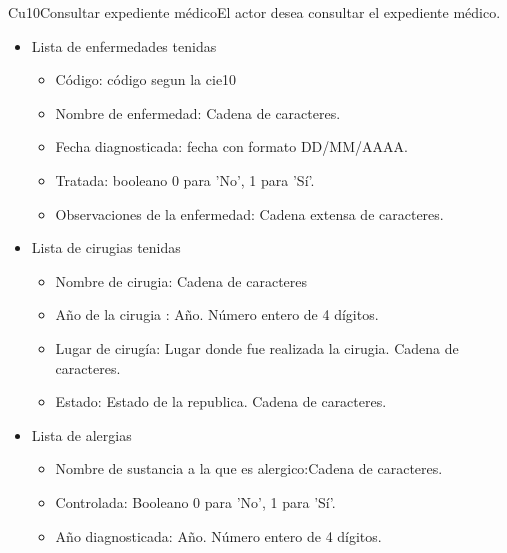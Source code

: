 \begin{UseCase}{Cu10}{Consultar expediente médico}{El actor desea consultar el expediente médico.}
{\begin{itemize}
\begin{itemize}
\begin{itemize}
                \item *Calle: Cádena de caracteres.
                \item Número: Cádena de caracteres.
                \item *Colonia: Cádena de caracteres.
                \item *Estado: Cádena de caracteres.
                \item *País : Cádena de caracteres.
                \item *Teléfono particular: Cadena de 8 a 10 caracteres.
                \item *Teléfono de emergencia: Cadena de 8 a 10 caracteres.
            \end{itemize}    
        
        \end{itemize}
        
       \item Lista de enfermedades tenidas
        \begin{itemize}
            \item Código: código segun la cie10
            \item Nombre de enfermedad: Cadena de caracteres. 
            \item Fecha diagnosticada: fecha con formato  DD/MM/AAAA.
            \item Tratada:  booleano 0 para 'No', 1 para 'Sí'.
            \item Observaciones de la enfermedad: Cadena extensa de caracteres.
        \end{itemize}
        \item Lista de cirugias tenidas
        \begin{itemize}
            \item Nombre de cirugia: Cadena de caracteres
            \item Año de la cirugia : Año. Número entero de 4 dígitos.
            \item Lugar de cirugía: Lugar donde fue realizada la cirugia. Cadena de caracteres.
            \item Estado: Estado de la republica. Cadena de caracteres.
        \end{itemize}
        
        \item Lista de alergias
        \begin{itemize}
            \item Nombre de sustancia a la que es alergico:Cadena de caracteres.
            \item Controlada: Booleano 0 para 'No', 1 para 'Sí'.
            \item Año diagnosticada: Año. Número entero de 4 dígitos. 
        \end{itemize}
        

\end{itemize}}
\end{UseCase}
